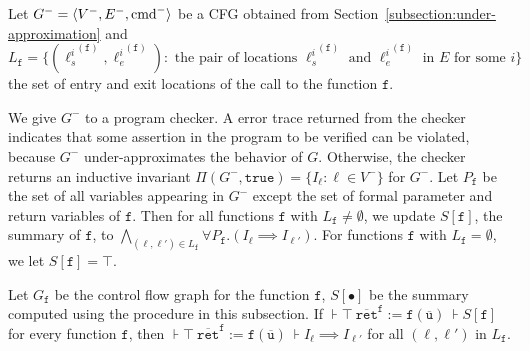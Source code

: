 Let $G^- = \langle V^-, E^-, \textmd{cmd}^- \rangle$ be a CFG obtained from Section~\ref{subsection:under-approximation} and $L_\mathtt{f}=\{({\ell_s^i}^{(\mathtt{f})},{\ell_e^i}^{(\mathtt{f})}):\mbox{ the pair of locations }{\ell_s^i}^{(\mathtt{f})}\mbox{ and }{\ell_e^i}^{(\mathtt{f})}\mbox{ in }E\mbox{ for some }i\}$ the set of entry and exit locations of the call to the function $\mathtt{f}$.

We give $G^-$ to a program checker. A error trace returned from the checker indicates that some assertion in the program to be verified can be violated, because $G^-$ under-approximates the behavior of $G$. Otherwise, the checker returns an inductive invariant $\Pi (G^-, \mathtt{true})= \{ I_\ell : \ell \in V^-
\}$ for $G^-$. Let $P_\mathtt{f}$ be the set of all variables appearing in $G^-$ except the set of formal parameter and return variables of $\mathtt{f}$.
Then for all functions $\mathtt{f}$ with $L_\mathtt{f}\neq \emptyset$, we update $S[\mathtt{f}]$, the summary of $\mathtt{f}$, to $\bigwedge_{(\ell,\ell')\in L_\mathtt{f}} \forall P_\mathtt{f}. (I_\ell \implies I_{\ell'})$. 
For functions $\mathtt{f}$ with $L_\mathtt{f}= \emptyset$, we let $S[\mathtt{f}]=\top$.

\begin{proposition}
  Let $G_{\mathtt{f}}$ be the control flow graph for the function
  $\mathtt{f}$, $S[\bullet]$ be the summary computed using the procedure in this subsection.
  If $\assert{\top}\ \mathtt{\overline{ret}^f} :=
    \mathtt{f} (\overline{\mathtt{u}})\ \assert{S[\mathtt{f}]}$ for every
  function $\mathtt{f}$, then $\assert{\top}\ \mathtt{\overline{ret}^f} :=
  \mathtt{f} (\overline{\mathtt{u}})\ \assert{I_\ell \implies I_{\ell'}}$ for all $(\ell,\ell')$ in $L_\mathtt{f}$.
\end{proposition}